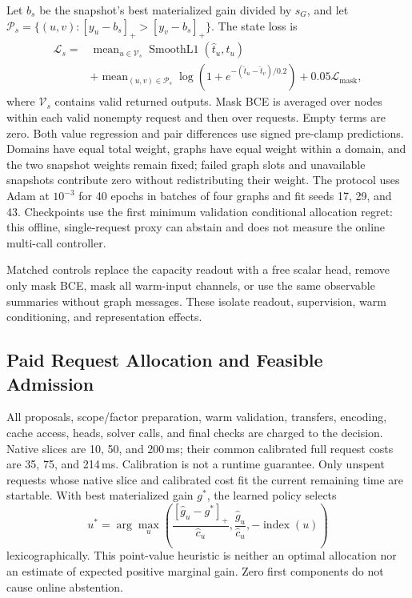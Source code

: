 Let $b_s$ be the snapshot's best materialized gain divided by $s_G$, and
let $\mathcal P_s=\{(u,v):[y_u-b_s]_+>[y_v-b_s]_+\}$. The state loss is
\begin{align}
 \mathcal L_s={}&\operatorname{mean}_{u\in\mathcal V_s}
       \operatorname{SmoothL1}(\widehat t_u,t_u)\nonumber\\
 &+\operatorname{mean}_{(u,v)\in\mathcal P_s}
       \log\!\left(1+e^{-(\widehat t_u-\widehat t_v)/0.2}\right)
   +0.05\mathcal L_{\mathrm{mask}},
 \label{eq:v4-loss}
\end{align}
where $\mathcal V_s$ contains valid returned outputs. Mask BCE is averaged
over nodes within each valid nonempty request and then over requests.
Empty terms are zero. Both value regression and pair differences use signed
pre-clamp predictions. Domains have equal total weight, graphs have equal
weight within a domain, and the two snapshot weights remain fixed; failed
graph slots and unavailable snapshots contribute zero without redistributing
their weight. The protocol uses Adam at $10^{-3}$ for 40 epochs in batches
of four graphs and fit seeds 17, 29, and 43. Checkpoints use the first minimum
validation conditional allocation regret: this offline, single-request
proxy can abstain and does not measure the online multi-call controller.

Matched controls replace the capacity readout with a free scalar head,
remove only mask BCE, mask all warm-input channels, or use the same
observable summaries without graph messages. These isolate readout,
supervision, warm conditioning, and representation effects.

\subsection{Paid Request Allocation and Feasible Admission}
\label{sec:v4-controller}
All proposals, scope/factor preparation, warm validation, transfers,
encoding, cache access, heads, solver calls, and final checks are charged
to the decision. Native slices are 10, 50, and 200\,ms; their common
calibrated full request costs are 35, 75, and 214\,ms.
Calibration is not a runtime guarantee. Only unspent requests whose native
slice and calibrated cost fit the current remaining time are startable.
With best materialized gain $g^*$, the learned policy selects
\begin{equation}
 u^*=\arg\max_u\left(
 \frac{[\widehat g_u-g^*]_+}{\widehat c_u},
 \frac{\widehat g_u}{\widehat c_u},-\operatorname{index}(u)\right)
 \label{eq:v4-priority}
\end{equation}
lexicographically. This point-value heuristic is neither an optimal
allocation nor an estimate of expected positive marginal gain. Zero first
components do not cause online abstention.


